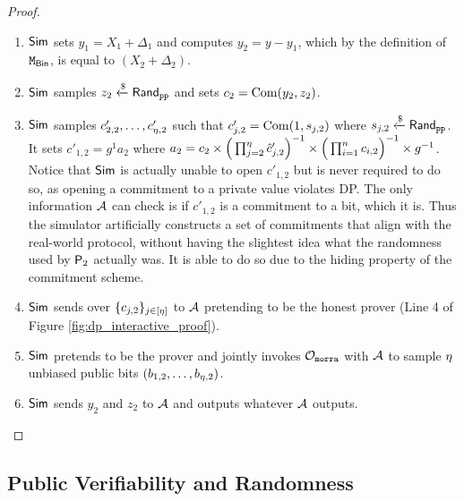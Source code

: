 \begin{proof}
\begin{enumerate}
    \item{$\mathsf{Sim}$ sets $y_1= X_1 + \Delta_1$ and computes $y_2 = y - y_1$, which by the definition of $\mathtt{M}_{\mathsf{Bin}}$, is equal to $(X_2 + \Delta_2)$.}

    \item{$\mathsf{Sim}$ samples $z_2 \xleftarrow{\$} \mathsf{Rand}_{\texttt{pp}}$ and sets $c_{2} = \operatorname{Com}(y_2, z_{2})$.}

    \item{$\mathsf{Sim}$ samples $c'_{2,2}, \dots, c'_{{\eta},2}$ such that $c'_{j,2} = \operatorname{Com}(1, s_{j,2})$ where $s_{j,2} \xleftarrow{\$} \mathsf{Rand}_{\texttt{pp}}$. 
     It sets $c'_{1,2} = g^1a_2$ where $a_2 = c_{2} \times  \Big( \prod_{j=2}^{\eta} \hat{c}'_{j,2}\Big)^{-1} \times \Big( \prod_{i=1}^{n} c_{i,2}\Big)^{-1} \times g^{-1}$. 
     Notice that $\mathsf{Sim}$ is actually unable to open $c'_{1,2}$ but is never required to do so, as opening a commitment to a private value violates DP. The only information $\mathcal{A}$ can check is if $c'_{1,2}$ is a commitment to a bit, which it is. Thus the simulator artificially constructs a set of commitments that align with the real-world protocol, without having the slightest idea what the randomness used by $\mathsf{P}_2$ actually was. It is able to do so due to the hiding property of the commitment scheme.}
    
     \item{$\mathsf{Sim}$ sends over $\{c_{j,2}\}_{j \in [\eta]}$ to $\mathcal{A}$ pretending to be the honest prover (Line 4 of Figure \ref{fig:dp_interactive_proof}).}
	    
    \item{$\mathsf{Sim}$ pretends to be the prover and jointly invokes $\mathcal{O}_{\mathtt{morra}}$ with $\mathcal{A}$ to sample $\eta$ unbiased public bits $(b_{1,2}, \dots, b_{\eta,2})$.}
    
    \item{$\mathsf{Sim}$ sends $y_2$ and $z_{2}$ to $\mathcal{A}$ and outputs whatever $\mathcal{A}$ outputs.}
    \end{enumerate}
\end{proof}
%
\subsection{Public Verifiability and Randomness}


